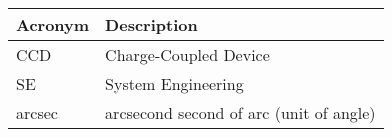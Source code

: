 \addtocounter{table}{-1}
\begin{longtable}{p{}p{}}\hline
\textbf{Acronym} & \textbf{Description}  \\\hline

CCD & Charge-Coupled Device \\\hline
SE & System Engineering \\\hline
arcsec & arcsecond second of arc (unit of angle) \\\hline
\end{longtable}
